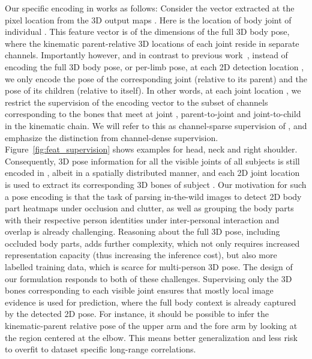 \documentclass[acmtog,authorversion]{acmart}
\begin{document}
Our specific encoding in  works as follows: Consider the  vector  extracted at the pixel location  from the 3D output maps . Here  is the location of body joint  of individual . 
This  feature vector is of the dimensions of the full 3D body pose, where the kinematic parent-relative 3D locations of each joint reside in separate channels. Importantly however, and in contrast to previous work~\cite{mehta_3dv18,zanfir_nips18}, instead of encoding the full 3D body pose, or per-limb pose, at each 2D detection location , we only encode the pose of the corresponding joint (relative to its parent) and the pose of its children (relative to itself). In other words, at each joint location , we restrict the supervision of the encoding vector  to the subset of channels corresponding to the bones that meet at joint , parent-to-joint and joint-to-child in the kinematic chain. We will refer to this as channel-sparse supervision of , and emphasize the distinction from channel-dense supervision. 
Figure~\ref{fig:feat_supervision} shows examples for head, neck and right shoulder. 
Consequently, 3D pose information for all the visible joints of all subjects is still encoded in , albeit in a spatially distributed manner, and each 2D joint location  is used to extract its corresponding 3D bones of subject .
Our motivation for such a pose encoding is that the task of parsing in-the-wild images to detect 2D body part heatmaps under occlusion and clutter, as well as grouping the body parts with their respective person identities under inter-personal interaction and overlap is already challenging. 
Reasoning about the full 3D pose, including occluded body parts, adds further complexity, which not only requires increased representation capacity (thus increasing the inference cost), but also more labelled training data, which is scarce for multi-person 3D pose. The design of our formulation responds to both of these challenges.  
Supervising only the 3D bones corresponding to each visible joint ensures that mostly local image evidence is used for prediction, where the full body context is already captured by the detected 2D pose. 
For instance, it should be possible to infer the kinematic-parent relative pose of the upper arm and the fore arm by looking at the region centered at the elbow. This means better generalization and less risk to overfit to dataset specific long-range correlations.
\end{document}
